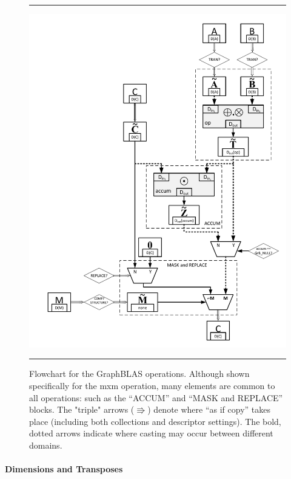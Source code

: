 \begin{figure}
    \hrule
    \begin{center}
        \includegraphics[width=5.5in]{mxm_operation_flowchart_1_3d.pdf}
    \end{center}
    \caption{Flowchart for the GraphBLAS operations. Although shown specifically for
	the {\sf mxm} operation, many elements are common to all operations: such as the 
	``{\sf ACCUM}'' and ``{\sf MASK and REPLACE}'' blocks.  The "triple" arrows 
    ($\Rrightarrow$) denote where ``as if copy'' takes place (including both 
    collections and descriptor settings).  The bold, dotted arrows indicate
    where casting may occur between different domains. }
    \label{Fig:mxmFlowchart}
    \hrule
\end{figure}

\paragraph{Dimensions and Transposes}

